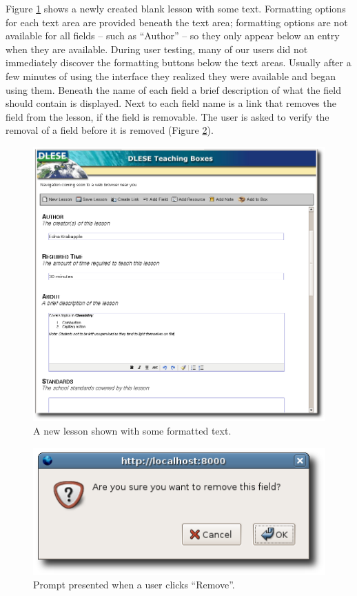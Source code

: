 \documentclass[10pt,letter,titlepage]{article}
\begin{document}
Figure \ref{fig: blank lesson ss} shows a newly created blank lesson with some
text. Formatting options for each text area are provided beneath the text area;
formatting options are not available for all fields -- such as ``Author'' -- so
they only appear below an entry when they are available. During user testing,
many of our users did not immediately discover the formatting buttons below the
text areas. Usually after a few minutes of using the interface they realized
they were available and began using them. Beneath the name of each field a brief
description of what the field should contain is displayed.  Next to each field
name is a link that removes the field from the lesson, if the field is
removable. The user is asked to verify the removal of a field before it is
removed (Figure \ref{fig: remove prompt ss}).

\begin{figure}
	\centering
	\includegraphics[width=0.9\linewidth]{figures/formatting}
	\caption{A new lesson shown with some formatted text.}
	\label{fig: blank lesson ss}
\end{figure}

\begin{figure}
	\centering
	\includegraphics[width=0.45\linewidth]{figures/remove_prompt}
	\caption{Prompt presented when a user clicks ``Remove''.}
	\label{fig: remove prompt ss}
\end{figure}
\end{document}
